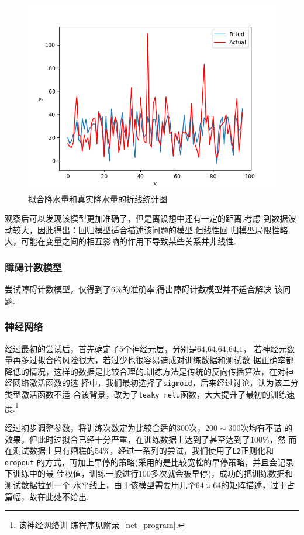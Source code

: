 \documentclass[UTF8, a4paper]{ctexart}
\begin{document}
\begin{figure}[h!]
	\centering
	\includegraphics[scale=0.3]{fit2.png}
	\caption{拟合降水量和真实降水量的折线统计图}
\end{figure}

观察后可以发现该模型更加准确了，但是离设想中还有一定的距离.考虑
到数据波动较大，因此得出：回归模型适合描述该问题的模型.但线性回
归模型局限性略大，可能在变量之间的相互影响的作用下导致某些关系并非线性.

\subsubsection{障碍计数模型}

尝试障碍计数模型，仅得到了$6\%$的准确率,得出障碍计数模型并不适合解决
该问题.

\subsubsection{神经网络}

经过最初的尝试后，首先确定了$5$个神经元层，分别是$64$,$64$,$64$,$64$,$1$，
若神经元数量再多过拟合的风险很大，若过少也很容易造成对训练数据和测试数
据正确率都降低的情况，这样的数据是比较合理的.训练方法是传统的反向传播算法，在对神经网络激活函数的选
择中，我们最初选择了\verb+sigmoid+，后来经过讨论，认为该二分类型激活函数不适
合该背景，改为了\verb+leaky relu+函数，大大提升了最初的训练速度.\footnote{该神经网络训
	练程序见附录~\textcolor{red}{\ref{net_program}}.}

经过初步调整参数，将训练次数定为比较合适的$300$次，$200\sim300$次均有不错
的效果，但此时过拟合已经十分严重，在训练数据上达到了甚至达到了$100\%$，然
而在测试数据上只有糟糕的$54\%$，经过一系列的尝试，我们使用了\verb+L2+正则化和\verb+dropout+
的方式，再加上早停的策略(采用的是比较宽松的早停策略，并且会记录下训练中的最
佳权值，训练一般进行$100$多次就会被早停)，成功的把训练数据和测试数据拉到一个
水平线上，由于该模型需要用几个$64\times64$的矩阵描述，过于占篇幅，故在此处不给出.
\end{document}
